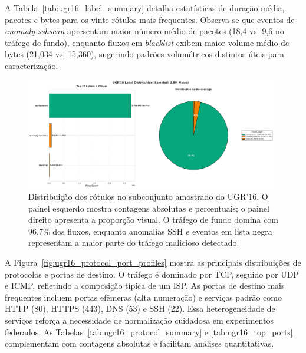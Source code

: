 \documentclass[a4paper, 12pt]{article}
\begin{document}
A Tabela~\ref{tab:ugr16_label_summary} detalha estatísticas de duração média, pacotes e bytes para os vinte rótulos mais frequentes. Observa-se que eventos de \textit{anomaly-sshscan} apresentam maior número médio de pacotes (18{,}4 vs. 9{,}6 no tráfego de fundo), enquanto fluxos em \textit{blacklist} exibem maior volume médio de bytes (21{,}034 vs. 15{,}360), sugerindo padrões volumétricos distintos úteis para caracterização.

\begin{figure}[H]
    \centering
    \includegraphics[width=0.98\textwidth]{ugr16_label_distribution.png}
    \caption{Distribuição dos rótulos no subconjunto amostrado do UGR'16. O painel esquerdo mostra contagens absolutas e percentuais; o painel direito apresenta a proporção visual. O tráfego de fundo domina com 96{,}7\% dos fluxos, enquanto anomalias SSH e eventos em lista negra representam a maior parte do tráfego malicioso detectado.}
    \label{fig:ugr16_label_distribution}
\end{figure}



A Figura~\ref{fig:ugr16_protocol_port_profiles} mostra as principais distribuições de protocolos e portas de destino. O tráfego é dominado por TCP, seguido por UDP e ICMP, refletindo a composição típica de um ISP. As portas de destino mais frequentes incluem portas efêmeras (alta numeração) e serviços padrão como HTTP (80), HTTPS (443), DNS (53) e SSH (22). Essa heterogeneidade de serviços reforça a necessidade de normalização cuidadosa em experimentos federados. As Tabelas~\ref{tab:ugr16_protocol_summary} e \ref{tab:ugr16_top_ports} complementam com contagens absolutas e facilitam análises quantitativas.
\end{document}
